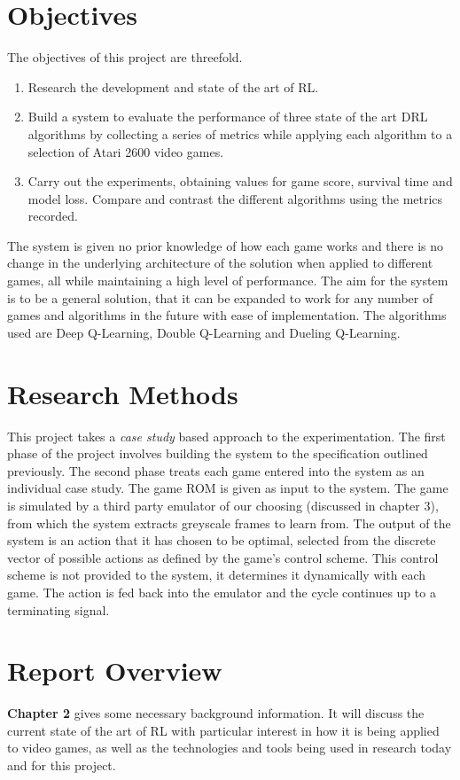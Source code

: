 \section{Objectives}
The objectives of this project are threefold. 
\begin{enumerate}
	\item Research the development and state of the art of RL.
	\item Build a system to evaluate the performance of three state of the art DRL algorithms by collecting a series of metrics while applying each algorithm to a selection of Atari 2600 video games. 
	\item Carry out the experiments, obtaining values for game score, survival time and model loss. Compare and contrast the different algorithms using the metrics recorded.
\end{enumerate}
The system is given no prior knowledge of how each game works and there is no change in the underlying architecture of the solution when applied to different games, all while maintaining a high level of performance. The aim for the system is to be a general solution, that it can be expanded to work for any number of games and algorithms in the future with ease of implementation. The algorithms used are Deep Q-Learning, Double Q-Learning and Dueling Q-Learning.
\section{Research Methods}
This project takes a \textit{case study} based approach to the experimentation. The first phase of the project involves building the system to the specification outlined previously. The second phase treats each game entered into the system as an individual case study. The game ROM is given as input to the system. The game is simulated by a third party emulator of our choosing (discussed in chapter 3), from which the system extracts greyscale frames to learn from. The output of the system is an action that it has chosen to be optimal, selected from the discrete vector of possible actions as defined by the game's control scheme. This control scheme is not provided to the system, it determines it dynamically with each game. The action is fed back into the emulator and the cycle continues up to a terminating signal.

\section{Report Overview}
\textbf{Chapter 2} gives some necessary background information. It will discuss the current state of the art of RL with particular interest in how it is being applied to video games, as well as the technologies and tools being used in research today and for this project.

